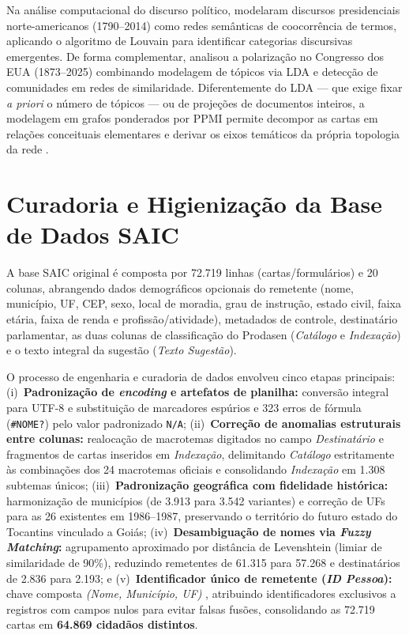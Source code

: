 \documentclass[12pt]{article}
\begin{document}
Na análise computacional do discurso político, \cite{rule2015} modelaram discursos presidenciais norte-americanos (1790--2014) como redes semânticas de coocorrência de termos, aplicando o algoritmo de Louvain \cite{blondel2008} para identificar categorias discursivas emergentes. De forma complementar, \cite{erz2026} analisou a polarização no Congresso dos EUA (1873--2025) combinando modelagem de tópicos via LDA e detecção de comunidades em redes de similaridade. Diferentemente do LDA --- que exige fixar \textit{a priori} o número de tópicos --- ou de projeções de documentos inteiros, a modelagem em grafos ponderados por PPMI permite decompor as cartas em relações conceituais elementares e derivar os eixos temáticos da própria topologia da rede \cite{macanovic2022,tsai2022}.

\section{Curadoria e Higienização da Base de Dados SAIC}

A base SAIC original é composta por 72.719 linhas (cartas/formulários) e 20 colunas, abrangendo dados demográficos opcionais do remetente (nome, município, UF, CEP, sexo, local de moradia, grau de instrução, estado civil, faixa etária, faixa de renda e profissão/atividade), metadados de controle, destinatário parlamentar, as duas colunas de classificação do Prodasen (\textit{Catálogo} e \textit{Indexação}) e o texto integral da sugestão (\textit{Texto Sugestão}).

O processo de engenharia e curadoria de dados envolveu cinco etapas principais: (i)~\textbf{Padronização de \textit{encoding} e artefatos de planilha:} conversão integral para UTF-8 e substituição de marcadores espúrios e 323 erros de fórmula (\texttt{\#NOME?}) pelo valor padronizado \texttt{N/A}; (ii)~\textbf{Correção de anomalias estruturais entre colunas:} realocação de macrotemas digitados no campo \textit{Destinatário} e fragmentos de cartas inseridos em \textit{Indexação}, delimitando \textit{Catálogo} estritamente às combinações dos 24 macrotemas oficiais e consolidando \textit{Indexação} em 1.308 subtemas únicos; (iii)~\textbf{Padronização geográfica com fidelidade histórica:} harmonização de municípios (de 3.913 para 3.542 variantes) e correção de UFs para as 26 existentes em 1986--1987, preservando o território do futuro estado do Tocantins vinculado a Goiás; (iv)~\textbf{Desambiguação de nomes via \textit{Fuzzy Matching}:} agrupamento aproximado por distância de Levenshtein \cite{levenshtein1966,navarro2001} (limiar de similaridade de 90\%), reduzindo remetentes de 61.315 para 57.268 e destinatários de 2.836 para 2.193; e (v)~\textbf{Identificador único de remetente (\textit{ID Pessoa}):} chave composta \textit{(Nome, Município, UF)} \cite{monclaire1991}, atribuindo identificadores exclusivos a registros com campos nulos para evitar falsas fusões, consolidando as 72.719 cartas em \textbf{64.869 cidadãos distintos}.
\end{document}
